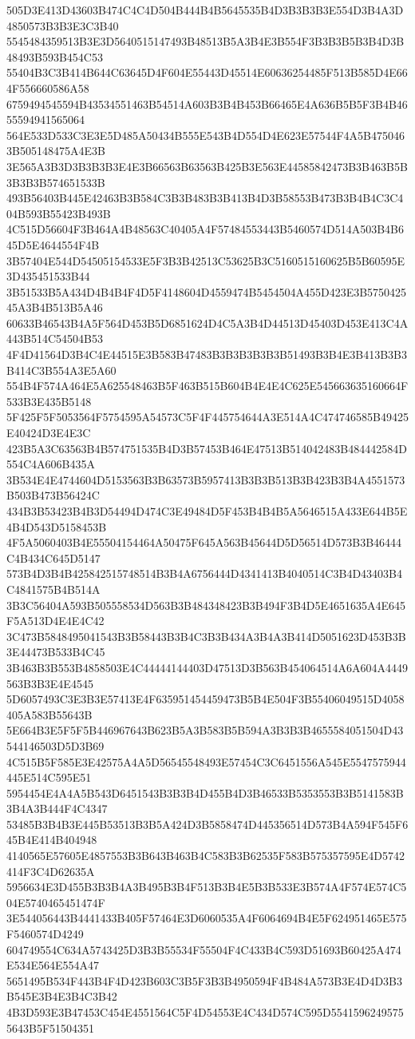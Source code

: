 {{{{{{{{{{{{{{{{{{{{{505D3E413D43603B474C4C4D504B444B4B5645535B4D3B3B3B3E554D3B4A3D4850573B3B3E3C3B40
5545484359513B3E3D5640515147493B48513B5A3B4E3B554F3B3B3B5B3B4D3B48493B593B454C53
55404B3C3B414B644C63645D4F604E55443D45514E60636254485F513B585D4E664F556660586A58
6759494545594B43534551463B54514A603B3B4B453B66465E4A636B5B5F3B4B4655594941565064
564E533D533C3E3E5D485A50434B555E543B4D554D4E623E57544F4A5B4750463B505148475A4E3B
3E565A3B3D3B3B3B3E4E3B66563B63563B425B3E563E44585842473B3B463B5B3B3B3B574651533B
493B56403B445E42463B3B584C3B3B483B3B413B4D3B58553B473B3B4B4C3C404B593B55423B493B
4C515D56604F3B464A4B48563C40405A4F57484553443B5460574D514A503B4B645D5E4644554F4B
3B57404E544D54505154533E5F3B3B42513C53625B3C5160515160625B5B60595E3D435451533B44
3B51533B5A434D4B4B4F4D5F4148604D4559474B5454504A455D423E3B575042545A3B4B513B5A46
60633B46543B4A5F564D453B5D6851624D4C5A3B4D44513D45403D453E413C4A443B514C54504B53
4F4D41564D3B4C4E44515E3B583B47483B3B3B3B3B3B51493B3B4E3B413B3B3B414C3B554A3E5A60
554B4F574A464E5A625548463B5F463B515B604B4E4E4C625E545663635160664F533B3E435B5148
5F425F5F5053564F5754595A54573C5F4F445754644A3E514A4C474746585B49425E40424D3E4E3C
423B5A3C63563B4B574751535B4D3B57453B464E47513B514042483B484442584D554C4A606B435A
3B534E4E4744604D5153563B3B63573B5957413B3B3B513B3B423B3B4A4551573B503B473B56424C
434B3B53423B4B3D54494D474C3E49484D5F453B4B4B5A5646515A433E644B5E4B4D543D5158453B
4F5A5060403B4E55504154464A50475F645A563B45644D5D56514D573B3B46444C4B434C645D5147
573B4D3B4B425842515748514B3B4A6756444D4341413B4040514C3B4D43403B4C4841575B4B514A
3B3C56404A593B505558534D563B3B484348423B3B494F3B4D5E4651635A4E645F5A513D4E4E4C42
3C473B5848495041543B3B58443B3B4C3B3B434A3B4A3B414D5051623D453B3B3E44473B533B4C45
3B463B3B553B4858503E4C44444144403D47513D3B563B454064514A6A604A4449563B3B3E4E4545
5D6057493C3E3B3E57413E4F635951454459473B5B4E504F3B55406049515D4058405A583B55643B
5E664B3E5F5F5B446967643B623B5A3B583B5B594A3B3B3B4655584051504D43544146503D5D3B69
4C515B5F585E3E42575A4A5D56545548493E57454C3C6451556A545E5547575944445E514C595E51
5954454E4A4A5B543D6451543B3B3B4D455B4D3B46533B5353553B3B5141583B3B4A3B444F4C4347
53485B3B4B3E445B53513B3B5A424D3B5858474D445356514D573B4A594F545F645B4E414B404948
4140565E57605E4857553B3B643B463B4C583B3B62535F583B575357595E4D5742414F3C4D62635A
5956634E3D455B3B3B4A3B495B3B4F513B3B4E5B3B533E3B574A4F574E574C504E5740465451474F
3E544056443B4441433B405F57464E3D6060535A4F6064694B4E5F624951465E575F5460574D4249
604749554C634A5743425D3B3B55534F55504F4C433B4C593D51693B60425A474E534E564E554A47
5651495B534F443B4F4D423B603C3B5F3B3B4950594F4B484A573B3E4D4D3B3B545E3B4E3B4C3B42
4B3D593E3B47453C454E4551564C5F4D54553E4C434D574C595D55415962495755643B5F51504351
}}}}}}}}}}}}}}}}}}}}}
